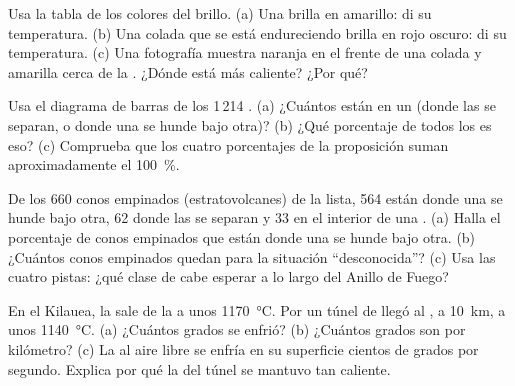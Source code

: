 \begin{exercise}[$\star$]\label{exo:g7:volcanoes:4}
Usa la tabla de los colores del brillo. (a) Una  brilla en amarillo:
di su temperatura. (b) Una colada que se está endureciendo brilla en rojo
oscuro: di su temperatura. (c) Una fotografía muestra  naranja en el
frente de una colada y  amarilla cerca de la . ¿Dónde está más
caliente? ¿Por qué?
\end{exercise}

\begin{exercise}[$\star\star$]\label{exo:g7:volcanoes:5}
Usa el diagrama de barras de los 1\,214 . (a) ¿Cuántos 
están en un  (donde las  se separan, o donde una se
hunde bajo otra)? (b) ¿Qué porcentaje de todos los  es eso?
(c) Comprueba que los cuatro porcentajes de la proposición suman
aproximadamente el 100~\%.
\end{exercise}

\begin{exercise}[$\star\star$]\label{exo:g7:volcanoes:6}
De los 660 conos empinados (estratovolcanes) de la lista, 564 están donde
una  se hunde bajo otra, 62 donde las  se separan y 33 en el
interior de una . (a) Halla el porcentaje de conos empinados que están
donde una  se hunde bajo otra. (b) ¿Cuántos conos empinados quedan
para la situación ``desconocida''? (c) Usa las cuatro pistas: ¿qué clase de
 cabe esperar a lo largo del Anillo de Fuego?
\end{exercise}

\begin{exercise}[$\star\star$]\label{exo:g7:volcanoes:7}
En el Kilauea, la  sale de la  a unos \qty{1170}{\degreeCelsius}.
Por un túnel de  llegó al , a \qty{10}{km}, a unos
\qty{1140}{\degreeCelsius}. (a) ¿Cuántos grados se enfrió? (b) ¿Cuántos
grados son por kilómetro? (c) La  al aire libre se enfría en su
superficie cientos de grados por segundo. Explica por qué la  del túnel
se mantuvo tan caliente.
\end{exercise}

